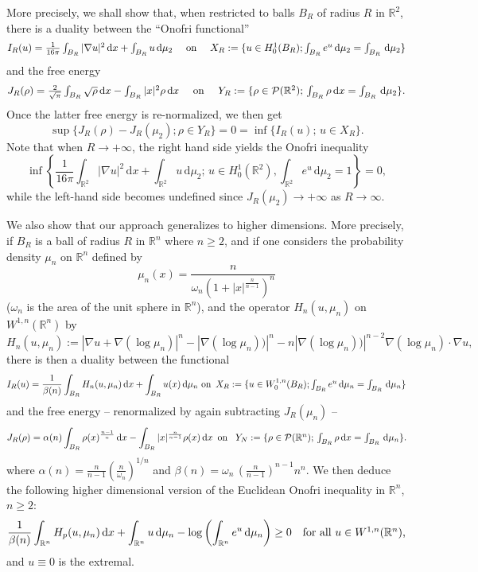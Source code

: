 \documentclass[10pt]{article}
\numberwithin{equation}{section}
\theoremstyle{plain}
\theoremstyle{definition}
\theoremstyle{remark}
\newcommand\R{{\mathbb R}}
\newcommand{\ib}{\int_{B_R}}
\newcommand\dd{\,\mbox{d} }
\begin{document}
More precisely, we shall show that, when restricted to balls $B_R$ of radius $R$ in $\R^2$, there is a duality between the ``Onofri functional'' 
\[
\hbox{$I_R(u)=\frac{1}{16\pi} \int_{B_R} |\nabla u|^2\dd x + \int_{B_R} u\dd\mu_2$ \quad on \quad  $
X_R:=\{u\in H^1_0(B_R); \int_{B_R} e^u\dd\mu_2 =\ib \dd\mu_2\} $}
\]
and the free energy 
\[
\hbox{$J_R(\rho) = \frac{2}{\sqrt{\pi}}\int_{B_R} \sqrt{\rho}\dd x - \int_{B_R} |x|^2\rho\dd x$ \quad on \quad $Y_R:=\{\rho \in {\cal P}(\R^2);\, \ib \rho\dd x = \ib \dd \mu_2\}$}.
\]
Once the latter free energy is re-normalized, we then get
\begin{equation}
\sup\{J_R(\rho) - J_R(\mu_2); \rho \in Y_R\}=0=\inf\{ I_R(u); \, u\in X_R\}.
\end{equation}
Note that when $R\to +\infty$, the right hand side yields the Onofri inequality
\[
\inf\left\{\frac{1}{16\pi} \int_{\R^2} |\nabla u|^2\dd x + \int_{\R^2} u\dd\mu_2; \, u\in H^1_0(\R^2),  \int_{\R^2} e^u\dd\mu_2=1\right\} =0,
\]
while the left-hand side becomes undefined since $J_R(\mu_2) \to +\infty$ as $R\to \infty$. 


We also show that our approach generalizes to  higher dimensions. More precisely,  if $B_R$ is a ball of radius $R$ in $\R^n$ where $n\geq 2$, and if one considers the probability density $\mu_n$ on $\R^n$ defined by
\[\mu_n(x)=\frac{n}{\omega_n(1+|x|^{\frac{n}{n-1}})^n}\]
($\omega_n$ is the area of the unit sphere in $\R^n$), and the operator $H_n(u,\mu_n)$ on $W^{1,n} (\R^n)$ by
\[H_n(u,\mu_n):=|\nabla u +\nabla(\log\mu_n)|^n - |\nabla(\log\mu_n))|^n - n |\nabla(\log\mu_n))|^{n-2}\nabla(\log\mu_n) \cdot \nabla u,\]
there is then a duality between the functional
\[I_R(u)=\frac{1}{\beta (n)}\int_{B_R} H_n(u,\mu_n)\dd x + \int_{B_R} u(x)\dd\mu_n \,\, \hbox{on $\, X_R:=\{u\in W^{1,n}_0(B_R); \int_{B_R} e^u\dd\mu_n =\ib \dd\mu_n$\}}\]
and the free energy -- renormalized by again subtracting $J_R(\mu_n)$ --
\[J_R(\rho) = \alpha (n) \int_{B_R} \rho(x)^{\frac{n-1}{n}}\dd x - \int_{B_R} |x|^{\frac{n}{n-1}}\rho(x)\dd x  \hbox{\,  on \, $Y_N:=\{\rho \in {\cal P}(\R^n);\, \ib \rho\dd x = \ib \dd \mu_n\}$}.\]
where $\alpha (n)=\frac{n}{n-1}(\frac{n}{\omega_n})^{1/n}$ and $\beta (n)=\omega_n\,(\frac{n}{n-1})^{n-1}n^n$. We then deduce the following higher dimensional version of the Euclidean Onofri inequality in $\R^n$, $n\geq 2$:
\begin{equation}
 \frac{1}{\beta (n)} \int_{\R ^n} H_p (u,\mu_n) \dd x +\int_{\R ^n} u \dd\mu_n -\log \left(\int_{\R ^n}  e^u \dd\mu_n \right)\geq 0\quad  \hbox{for all $u\in W^{1,n}(\R^n)$,}
 \end{equation}
and $u\equiv 0$ is the extremal.
\end{document}
